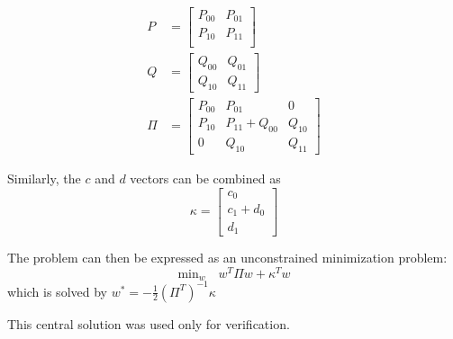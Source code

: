 \begin{align*}
P &= \left[ \begin{array}{cc} P_{00} & P_{01}\\P_{10} & P_{11} \\ \end{array} \right]\\
Q &= \left[ \begin{array}{cc} Q_{00} & Q_{01}\\Q_{10} & Q_{11}\end{array} \right]\\
\Pi &= \left[ \begin{array}{ccc}  P_{00} & P_{01} & 0 \\ P_{10} & P_{11}+Q_{00} & Q_{10} \\
0 & Q_{10} & Q_{11} \end{array} \right]
\end{align*}

Similarly, the $c$ and $d$ vectors can be combined as 
$$
\kappa = \left[ \begin{array}{c} c_0 \\ c_1 + d_0 \\ d_1 \end{array} \right]
$$

The problem can then be expressed as an unconstrained minimization problem:
$$
\text{min}_w \quad w^T \Pi w + \kappa^T w
$$
which is solved by $w^* = -\frac{1}{2}(\Pi^T) ^{-1} \kappa$

This central solution was used only for verification.